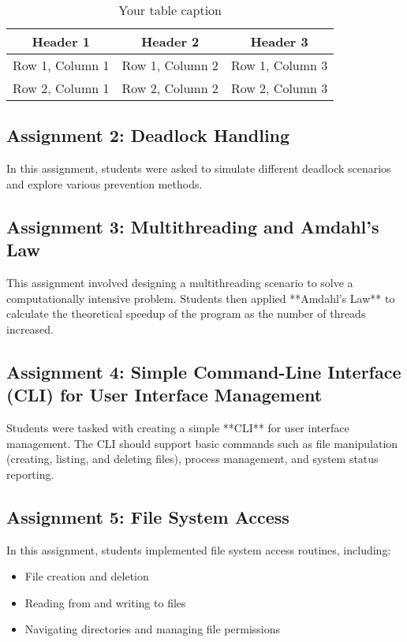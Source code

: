 \documentclass[12pt]{article}
\begin{document}
\begin{table}[htbp] %
    \centering
    \begin{tabular}{|c|c|c|} %
    \hline
    Header 1 & Header 2 & Header 3 \\ %
    \hline
    Row 1, Column 1 & Row 1, Column 2 & Row 1, Column 3 \\ %
    \hline
    Row 2, Column 1 & Row 2, Column 2 & Row 2, Column 3 \\ %
    \hline
    \end{tabular}
    \caption{Your table caption} %
    \label{tab:your_label} %
\end{table}

\subsection{Assignment 2: Deadlock Handling}
In this assignment, students were asked to simulate different deadlock scenarios and explore various prevention methods.

\subsection{Assignment 3: Multithreading and Amdahl's Law}
This assignment involved designing a multithreading scenario to solve a computationally intensive problem. Students then applied **Amdahl's Law** to calculate the theoretical speedup of the program as the number of threads increased.

\subsection{Assignment 4: Simple Command-Line Interface (CLI) for User Interface Management}
Students were tasked with creating a simple **CLI** for user interface management. The CLI should support basic commands such as file manipulation (creating, listing, and deleting files), process management, and system status reporting.

\subsection{Assignment 5: File System Access}
In this assignment, students implemented file system access routines, including:
\begin{itemize}
     \item File creation and deletion
    \item Reading from and writing to files
    \item Navigating directories and managing file permissions
\end{itemize}
\end{document}
